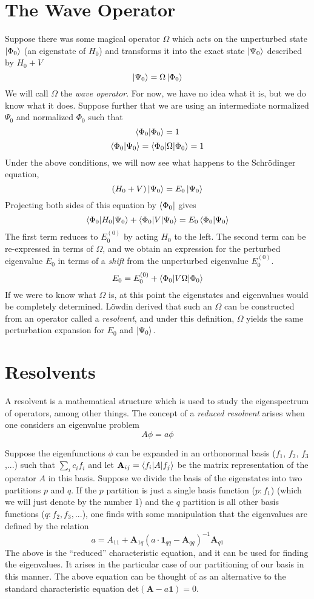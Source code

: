 \documentclass{article}
\newcommand{\Ezero}{E^{(0)}}
\begin{document}
\section{The Wave Operator}
Suppose there was some magical operator $\Omega$ which
acts on the unperturbed state $\ket{\Phi_0}$ (an eigenstate of $H_0$)
and transforms it into the exact state $\ket{\Psi_0}$ described by $H_0 + V$
\[\ket{\Psi_0} = \Omega \ket{\Phi_0} \]
We will call $\Omega$ the \textit{wave operator}.
For now, we have no idea what it is, but we do know what it does.
Suppose further that we are using an intermediate normalized $\Psi_0$ and normalized $\Phi_0$ such that
\[ \braket{\Phi_0|\Phi_0} = 1 \]
\[ \braket{\Phi_0 | \Psi_0} = \braket{\Phi_0 | \Omega | \Phi_0} = 1 \]
Under the above conditions, we will now see what happens to the Schr{\"o}dinger equation,
\[(H_0 + V) \ket{\Psi_0} = E_0 \ket{\Psi_0} \]
Projecting both sides of this equation by $\bra{\Phi_0}$ gives
\[\braket{\Phi_0 | H_0 | \Psi_0} + \braket{\Phi_0 | V | \Psi_0} = E_0 \braket{\Phi_0|\Psi_0} \]
The first term reduces to $\Ezero_0$ by acting $H_0$ to the left. The second term 
can be re-expressed in terms of $\Omega$, and we obtain an expression for the 
perturbed eigenvalue $E_0$ in terms of a \textit{shift} from the unperturbed eigenvalue $\Ezero_0$.  
\[ E_0 = \Ezero_0 + \braket{\Phi_0 | V \Omega | \Phi_0}  \]
If we were to know what $\Omega$ is, at this point the eigenstates and eigenvalues would be completely
determined.
L{\"o}wdin derived that such an $\Omega$ can be constructed from an operator called a \textit{resolvent},
and under this definition, $\Omega$ yields the same perturbation expansion for $E_0$ and $\ket{\Psi_0}$.

\section{Resolvents}
A resolvent is a mathematical structure which is used to study the eigenspectrum
of operators, among other things.
The concept of a \textit{reduced resolvent} arises when one considers an eigenvalue problem \[A \phi = a \phi \]

Suppose the eigenfunctions $\phi$ can be expanded in an orthonormal basis ($f_1$, $f_2$, $f_3$,...) such that $\sum_i c_i f_i $
and let $\mathbf{A}_{ij} = \braket{f_i | A | f_j}$ be the matrix representation of the operator $A$ in this basis. 
Suppose we divide the basis of the eigenstates into two partitions $p$ and $q$. 
If the $p$ partition is just a single basis function ($p: {f_1}$) (which we will just denote by the number 1) and the $q$ partition 
    is all other basis functions ($q: {f_2, f_3,...}$),
    one finds with some manipulation that the eigenvalues are defined by the relation 
\[ a =  A_{11} + \mathbf{A}_{1q}( a \cdot \mathbf{1}_{qq} - \mathbf{A}_{qq})^{-1} \mathbf{A}_{q1} \]
The above is the ``reduced'' characteristic equation, and it can be used for finding the eigenvalues.
It arises in the particular case of our partitioning of our basis in this manner.
The above equation can be thought of as an alternative to the standard characteristic equation $\mathrm{det}(\mathbf{A} - a\mathbf{1}) = 0$.
\end{document}

